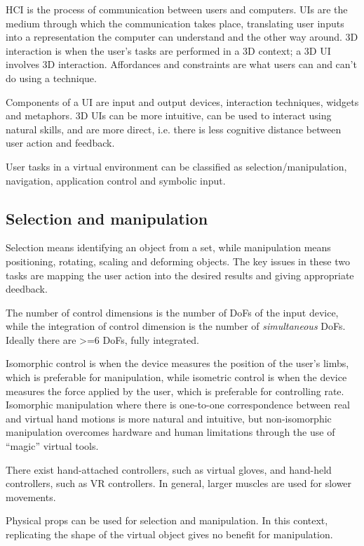 \documentclass[a4paper]{article}
\begin{document}
HCI is the process of communication between users and computers.
UIs are
the medium through which the communication takes place, translating user
inputs into a representation the computer can understand and the other
way around.
3D interaction is when the user's tasks are performed in a
3D context; a 3D UI involves 3D interaction.
Affordances and constraints
are what users can and can't do using a technique.

Components of a UI are input and output devices, interaction techniques,
widgets and metaphors.
3D UIs can be more intuitive, can be used to
interact using natural skills, and are more direct, i.e. there is less
cognitive distance between user action and feedback.

User tasks in a virtual environment can be classified as
selection/manipulation, navigation, application control and symbolic
input.

\subsection{Selection and manipulation}

Selection means identifying an object from a set, while manipulation
means positioning, rotating, scaling and deforming objects.
The key
issues in these two tasks are mapping the user action into the desired
results and giving appropriate deedback.

The number of control dimensions is the number of DoFs of the input
device, while the integration of control dimension is the number of
\emph{simultaneous} DoFs.
Ideally there are \textgreater=6 DoFs, fully
integrated.

Isomorphic control is when the device measures the position of the
user's limbs, which is preferable for manipulation, while isometric
control is when the device measures the force applied by the user, which
is preferable for controlling rate.
Isomorphic manipulation where there is one-to-one correspondence between real and virtual hand motions is more
natural and intuitive, but non-isomorphic manipulation overcomes
hardware and human limitations through the use of ``magic'' virtual tools.

There exist hand-attached controllers, such as virtual gloves, and
hand-held controllers, such as VR controllers.
In general, larger
muscles are used for slower movements.

Physical props can be used for selection and manipulation.
In this
context, replicating the shape of the virtual object gives no benefit
for manipulation.
\end{document}
